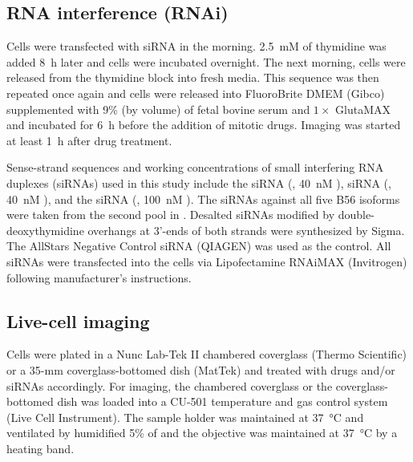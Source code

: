 \subsection{RNA interference (RNAi)}

Cells were transfected with siRNA in the morning. \SI{2.5}{mM} of thymidine was added \SI{8}{h} later and cells were incubated overnight. The next morning, cells were released from the thymidine block into fresh media. This sequence was then repeated once again and cells were released into FluoroBrite\texttrademark{} DMEM (Gibco) supplemented with 9\% (by volume) of fetal bovine serum and $1\times$ GlutaMAX and incubated for \SI{6}{h} before the addition of mitotic drugs. Imaging was started at least \SI{1}{h} after drug treatment.

Sense-strand sequences and working concentrations of small interfering RNA duplexes (siRNAs) used in this study include the  siRNA (, \SI{40}{nM} \cite{BubR1MitosisTurnover}),  siRNA (, \SI{40}{nM} \cite{BUB1-si5}), and the  siRNA (, \SI{100}{nM} \cite{BUBR1_XenopusVSHeLa}). The siRNAs against all five B56 isoforms were taken from the second pool in \cite{siB56s}.
Desalted siRNAs modified by double-deoxythymidine overhangs at 3'-ends of both strands were synthesized by Sigma. The AllStars Negative Control siRNA (QIAGEN) was used as the control. All siRNAs were transfected into the cells via Lipofectamine RNAiMAX (Invitrogen) following manufacturer’s instructions.

\subsection{Live-cell imaging}
\label{chpt3ImagingMethods}

Cells were plated in a Nunc Lab-Tek II chambered coverglass (Thermo Scientific) or a 35-mm coverglass-bottomed dish (MatTek) and treated with drugs and/or siRNAs accordingly. For imaging, the chambered coverglass or the coverglass-bottomed dish was loaded into a CU-501 temperature and gas control system (Live Cell Instrument). The sample holder was maintained at \SI{37}{\celsius} and ventilated by humidified 5\% of  and the objective was maintained at \SI{37}{\celsius} by a heating band.

